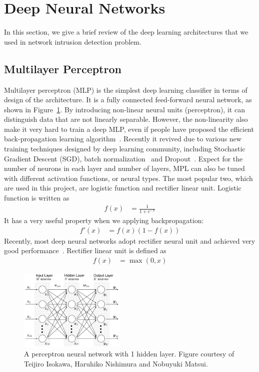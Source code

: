 \section{Deep Neural Networks}
In this section, we give a brief review of the deep learning architectures that we used
in network intrusion detection problem.

\subsection{Multilayer Perceptron}
Multilayer perceptron (MLP) is the simplest deep learning classifier in terms of
design of the architecture.
It is a fully connected feed-forward neural network, as shown in Figure~\ref{Fig:MLPArchitecture}.
By introducing non-linear neural units (perceptron), it can distinguish data that are
not linearly separable.
However, the non-linearity also make it very hard to train a deep MLP,
even if people have proposed the efficient back-propagation learning algorithm~\cite{Backpropagation}.
Recently it revived due to various new training techniques designed by deep learning community,
including Stochastic Gradient Descent (SGD),
batch normalization~\cite{BatchNorm} and Dropout~\cite{Dropout}.
Expect for the number of neurons in each layer and number of layers,
MPL can also be tuned with different activation functions, or neural types.
The most popular two, which are used in this project, are logistic function
and rectifier linear unit.
Logistic function is written as
\begin{align}
        f(x) &= \frac{1}{1 + e^{-x}}
\end{align}
It has a very useful property when we applying backpropagation:
\begin{align}
        f'(x) &= f(x) (1-f(x))
\end{align}
Recently, most deep neural networks adopt rectifier neural unit and achieved very good performance~\cite{DeepLearning}.
Rectifier linear unit is defined as
\begin{align}
        f(x) &= \max(0, x)
\end{align}


\begin{figure}[h]
\centering
\includegraphics[width=0.45\textwidth]{figures/multilayer_perceptron.png}
\caption{A perceptron neural network with 1 hidden layer.
        Figure courtesy of Teijiro Isokawa, Haruhiko Nishimura and Nobuyuki Matsui.}
\label{Fig:MLPArchitecture}
\end{figure}

